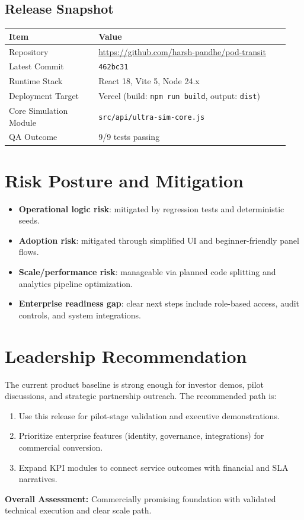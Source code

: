 \documentclass[11pt,a4paper]{article}
\begin{document}
\subsection*{Release Snapshot}
\begin{longtable}{>{\raggedright\arraybackslash}p{0.30\linewidth}p{0.64\linewidth}}
\toprule
Item & Value \\
\midrule
Repository & \url{https://github.com/harsh-pandhe/pod-transit} \\
Latest Commit & \texttt{462bc31} \\
Runtime Stack & React 18, Vite 5, Node 24.x \\
Deployment Target & Vercel (build: \texttt{npm run build}, output: \texttt{dist}) \\
Core Simulation Module & \texttt{src/api/ultra-sim-core.js} \\
QA Outcome & 9/9 tests passing \\
\bottomrule
\end{longtable}

\section{Risk Posture and Mitigation}
\begin{itemize}
  \item \textbf{Operational logic risk}: mitigated by regression tests and deterministic seeds.
  \item \textbf{Adoption risk}: mitigated through simplified UI and beginner-friendly panel flows.
  \item \textbf{Scale/performance risk}: manageable via planned code splitting and analytics pipeline optimization.
  \item \textbf{Enterprise readiness gap}: clear next steps include role-based access, audit controls, and system integrations.
\end{itemize}

\section{Leadership Recommendation}
The current product baseline is strong enough for investor demos, pilot discussions, and strategic partnership outreach. The recommended path is:
\begin{enumerate}
  \item Use this release for pilot-stage validation and executive demonstrations.
  \item Prioritize enterprise features (identity, governance, integrations) for commercial conversion.
  \item Expand KPI modules to connect service outcomes with financial and SLA narratives.
\end{enumerate}

\vspace{1em}
\noindent\textbf{Overall Assessment:} \textcolor{green!50!black}{Commercially promising foundation with validated technical execution and clear scale path.}
\end{document}

